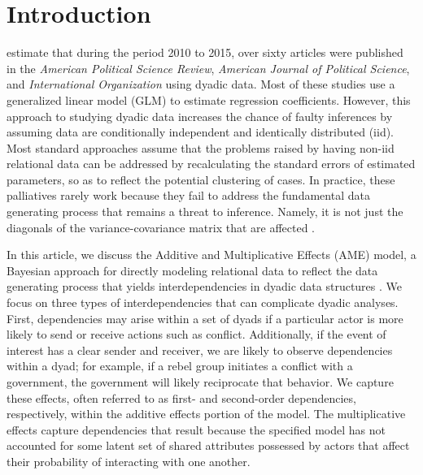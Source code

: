 \section{\textbf{Introduction}}

\citet{aronow:etal:2015} estimate that during the period 2010 to 2015, over sixty articles were published in the \textit{American Political Science Review}, \textit{American Journal of Political Science}, and \textit{International Organization} using dyadic data. Most of these studies use a generalized linear model (GLM) to estimate regression coefficients.  However, this approach to studying dyadic data increases the chance of faulty inferences by assuming data are conditionally independent and identically distributed (iid). Most standard approaches assume that the problems raised by having non-iid relational data can be addressed by recalculating the standard errors of estimated parameters, so as to reflect the potential clustering of cases. In practice, these palliatives rarely work because they fail to address the fundamental data generating process that remains a threat to inference. Namely, it is not just the diagonals of the variance-covariance matrix that are affected \citep{beck:2012, king:roberts:2014}. %

In this article, we discuss the Additive and Multiplicative Effects (AME) model, a Bayesian approach for directly modeling relational data to reflect the data generating process that yields interdependencies in dyadic data structures \citep{hoff:2008,minhas:etal:2016:arxiv}. We focus on three types of interdependencies that can complicate dyadic analyses. First, dependencies may arise within a set of dyads if a particular actor is more likely to send or receive actions such as conflict. Additionally, if the event of interest has a clear sender and receiver, we are likely to observe dependencies within a dyad; for example, if a rebel group initiates a conflict with a government, the government will likely reciprocate that behavior. We capture these effects, often referred to as first- and second-order dependencies, respectively, within the additive effects portion of the model. The multiplicative effects capture dependencies that result because the specified model has not accounted for some latent set of shared attributes possessed by actors that affect their probability of interacting with one another. %

